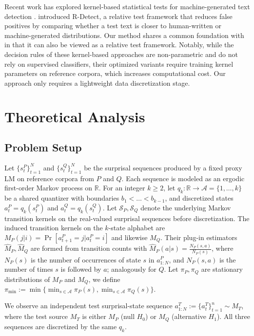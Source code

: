 \documentclass{article}
\theoremstyle{plain}
\theoremstyle{definition}
\theoremstyle{remark}
\begin{document}
Recent work has explored kernel-based statistical tests for machine-generated text detection \citep{zhang2024detecting,song2025deep}. \cite{song2025deep} introduced R-Detect, a relative test framework that reduces false positives by comparing whether a test text is closer to human-written or machine-generated distributions. Our method shares a common foundation with \cite{song2025deep} in that it can also be viewed as a relative test framework. Notably, while the decision rules of these kernel-based approaches are non-parametric and do not rely on supervised classifiers, their optimized variants require training kernel parameters on reference corpora, which increases computational cost. Our approach only requires a lightweight data discretization stage. 
\section{Theoretical Analysis}
\subsection{Problem Setup}
Let $\{s_t^P\}_{t=1}^{N}$ and $\{s_t^Q\}_{t=1}^{N}$ be the surprisal sequences produced by a fixed proxy LM on reference corpora from $P$ and $Q$. Each sequence is modeled as an ergodic first-order Markov process on $\mathbb{R}$.
For an integer $k \ge 2$, let $q_k: \mathbb{R} \rightarrow \mathcal{A}=\{1,\dots,k\}$ be a shared quantizer with boundaries $b_1<\dots <b_{k-1}$, and discretized states $a_t^P = q_k(s_t^P)$ and $a_t^Q = q_k(s_t^Q)$. Let $\mathcal{S}_P,\mathcal{S}_Q$ denote the underlying Markov transition kernels on the real-valued surprisal sequences before discretization.  The induced transition kernels on the $k$-state alphabet are $M_P(j|i)=\Pr[a_{t+1}^P=j|a_{t}^P=i]$ and likewise $M_Q$. Their plug-in estimators $\hat M_P, \hat M_Q$ are formed from transition counts with $\hat{M}_P(a|s) = \frac{N_P(s,a)}{N_P(s)}$, where $N_P(s)$ is the number of occurrences of state $s$ in $a_{1:N}^P$, and $N_P(s,a)$ is the number of times $s$ is followed by $a$; analogously for $Q$. Let $\pi_P, \pi_Q$ are stationary distributions of $M_P$ and $M_Q$, we define
$\pi_{\min}:=\min \{\min_{s\in \mathcal{A}}\pi_P(s),\min_{s\in \mathcal{A}}\pi_Q(s)\} $.

We observe an independent test surprisal-state sequence $a^T_{1:N}:=\{a_t^T\}_{t=1}^{n} \sim M_T$, where the test source $M_T$ is either $M_P$ (null $H_0$) or $M_Q$ (alternative $H_1$). All three sequences are discretized by the same $q_k$.
\end{document}
